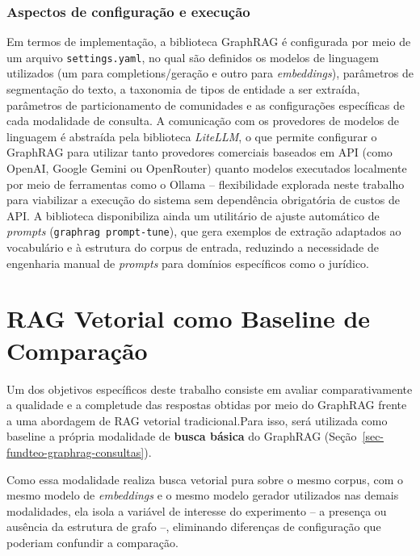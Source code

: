 \subsubsection{Aspectos de configuração e execução}
\label{sec-fundteo-graphrag-config}

Em termos de implementação, a biblioteca GraphRAG é configurada por meio de um
arquivo \texttt{settings.yaml}, no qual são definidos os modelos de linguagem
utilizados (um para completions/geração e outro para \textit{embeddings}),
parâmetros de segmentação do texto, a taxonomia de tipos de entidade a ser
extraída, parâmetros de particionamento de comunidades e as configurações
específicas de cada modalidade de consulta. A comunicação com os provedores de
modelos de linguagem é abstraída pela biblioteca \textit{LiteLLM}, o que
permite configurar o GraphRAG para utilizar tanto provedores comerciais
baseados em API (como OpenAI, Google Gemini ou OpenRouter) quanto modelos
executados localmente por meio de ferramentas como o Ollama -- flexibilidade
explorada neste trabalho para viabilizar a execução do sistema sem
dependência obrigatória de custos de API. A biblioteca disponibiliza ainda um
utilitário de ajuste automático de \textit{prompts}
(\texttt{graphrag prompt-tune}), que gera exemplos de extração adaptados ao
vocabulário e à estrutura do corpus de entrada, reduzindo a necessidade de
engenharia manual de \textit{prompts} para domínios específicos como o
jurídico.

\section{RAG Vetorial como Baseline de Comparação}
\label{sec-fundteo-baseline}

Um dos objetivos específicos deste trabalho consiste em avaliar
comparativamente a qualidade e a completude das respostas obtidas por meio do
GraphRAG frente a uma abordagem de RAG vetorial tradicional.Para isso, será utilizada 
como baseline a própria modalidade de \textbf{busca básica}
do GraphRAG (Seção~\ref{sec-fundteo-graphrag-consultas}).

Como essa modalidade realiza busca vetorial
pura sobre o mesmo corpus, com o mesmo modelo de \textit{embeddings} e o mesmo
modelo gerador utilizados nas demais modalidades, ela isola a variável de
interesse do experimento -- a presença ou ausência da estrutura de grafo --,
eliminando diferenças de configuração que poderiam confundir a comparação.



